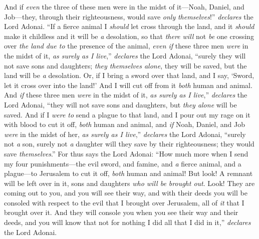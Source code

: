 \begin{biblechapter}
\verse And if \textit{even} the three of these men were in the midst of it—Noah, Daniel, and Job—they, through their righteousness, would save \textit{only} \textit{themselves}!” \textit{declares} the Lord Adonai.
\verse “If a fierce animal I \textit{should} let cross through the land, and it \textit{should} make it childless and it will be \textit{a} desolation, so that \textit{there will} not \textit{be} one crossing over \textit{the land} \textit{due to} the presence of the animal,
\verse \textit{even if} these three men \textit{were} in the midst of it, \textit{as surely as I live},” \textit{declares} the Lord Adonai, “surely they will not save sons and daughters; \textit{they themselves alone}, they will be saved, but the land will be \textit{a} desolation.
\verse Or, if I bring a sword over that land, and I say, ‘Sword, let it cross over into the land!’ And I will cut off from it \textit{both} human and animal.
\verse And \textit{if} these three men \textit{were} in the midst of it, \textit{as surely as I live},” \textit{declares} the Lord Adonai, “they will not save sons and daughters, but \textit{they alone} will be saved.
\verse And if I \textit{were to} send a plague to that land, and I pour out my rage on it with blood to cut it off, \textit{both} human and animal,
\verse and \textit{if} Noah, Daniel, and Job \textit{were} in the midst of her, \textit{as surely as I live},” \textit{declares} the Lord Adonai, “surely not \textit{a} son, surely not \textit{a} daughter will they save by their righteousness; they would save \textit{themselves}.”
\verse For thus says the Lord Adonai: “How much more when I send my four punishments—the evil sword, and famine, and \textit{a} fierce animal, and a plague—to Jerusalem to cut it off, \textit{both} human and animal!
\verse But look! A remnant will be left over in it, sons and daughters \textit{who will be brought out}. Look! They are coming out to you, and you will see their way, and with their deeds you will be consoled with respect to the evil that I brought over Jerusalem, all of \textit{it} that I brought over it.
\verse And they will console you when you see their way and their deeds, and you will know that not for nothing I did all that I did in it,” \textit{declares} the Lord Adonai.
\end{biblechapter}

